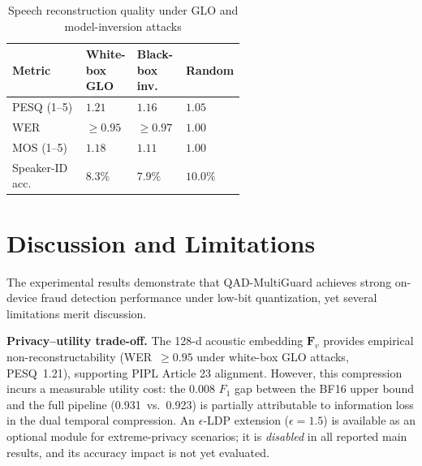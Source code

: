 \documentclass[final,5p,times,number]{elsarticle}
\begin{document}
\begin{table}[!t]
\centering
\caption{Speech reconstruction quality under GLO and model-inversion attacks}
\label{tab:privacy_attack-en}
\small
\renewcommand{\arraystretch}{1.2}
\begin{tabular}{l>{\centering\arraybackslash}p{0.21\linewidth}>{\centering\arraybackslash}p{0.21\linewidth}>{\centering\arraybackslash}p{0.15\linewidth}}
\toprule
\textbf{Metric} & \textbf{White-box GLO} & \textbf{Black-box inv.} & \textbf{Random} \\
\midrule
PESQ (1--5) & $1.21$ & $1.16$ & $1.05$ \\
WER & $\ge 0.95$ & $\ge 0.97$ & $1.00$ \\
MOS (1--5) & $1.18$ & $1.11$ & $1.00$ \\
Speaker-ID acc. & $8.3\%$ & $7.9\%$ & $10.0\%$ \\
\bottomrule
\end{tabular}
\end{table}

\section{Discussion and Limitations}\label{sec:discussion}

The experimental results demonstrate that QAD-MultiGuard achieves strong on-device fraud detection performance under low-bit quantization, yet several limitations merit discussion.

\textbf{Privacy--utility trade-off.} The 128-d acoustic embedding $\bm{F}_v$ provides empirical non-reconstructability (WER~$\ge 0.95$ under white-box GLO attacks, PESQ~1.21), supporting PIPL Article 23 alignment. However, this compression incurs a measurable utility cost: the 0.008 $F_1$ gap between the BF16 upper bound and the full pipeline (0.931~vs.~0.923) is partially attributable to information loss in the dual temporal compression. An $\epsilon$-LDP extension ($\epsilon=1.5$) is available as an optional module for extreme-privacy scenarios; it is \emph{disabled} in all reported main results, and its accuracy impact is not yet evaluated.
\end{document}
